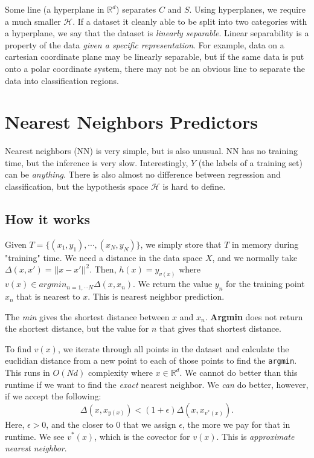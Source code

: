 \documentclass[titlepage, 12pt, leqno]{article}
\begin{document}
Some line (a hyperplane in $ \mathbb{R}^{d}$) separates $C$ and $S$. Using 
hyperplanes, we require a much smaller $ \mathcal{H}$. If a dataset it cleanly
able to be split into two categories with a hyperplane, we say that the dataset is
\textit{linearly separable}. Linear separability is a property of the data
\textit{given a specific representation}. For example, data on a cartesian 
coordinate plane may be linearly separable, but if the same data is put onto a
polar coordinate system, there may not be an obvious line to separate the data
into classification regions.

\pagebreak
\section{Nearest Neighbors Predictors}
Nearest neighbors (NN) is very simple, but is also unusual. NN has no training
time, but the inference is very slow. Interestingly, $Y$ (the labels of a
training set) can be \textit{anything}. There is also almost no difference 
between regression and classification, but the hypothesis space $ \mathcal{H}$ is
hard to define.

\subsection{How it works}
Given $T = \{(x_{1}, y_{1}), \cdots , (x_{N}, y_{N})\}$, we simply store that
$T$ in memory during "training" time. We need a distance in the data space $X$,
and we normally take $\Delta(x,x') = ||x-x'||^{2}$. Then, $h(x) = y_{v(x)}$ where
$v(x) \in argmin_{n=1, \cdots N}\Delta(x,x_{n})$. We return the value $y_{n}$ for
the training point $x_{n}$ that is nearest to $x$. This is nearest neighbor
prediction.

\begin{note}
    The \textit{min} gives the shortest distance between $x$ and $x_{n}$. 
    \textbf{Argmin} does not return the shortest distance, but the value for $n$
    that gives that shortest distance.
\end{note}

To find $v(x)$, we iterate through all points in the dataset and calculate the
euclidian distance from a new point to each of those points to find the 
\texttt{argmin}. This runs in $O(Nd)$ complexity where $x \in \mathbb{R}^{d}$. We
cannot do better than this runtime if we want to find the \textit{exact} nearest
neighbor. We \textit{can} do better, however, if we accept the following:
\[
    \Delta(x,x_{y(x)}) < (1+\epsilon)\Delta(x, x_{v^{*}(x)}).
\]
Here, $\epsilon >0$, and the closer to 0 that we assign $\epsilon$, the more we
pay for that in runtime. We see $v^{*}(x)$, which is the covector for $v(x)$.
This is \textit{approximate nearest neighbor}.
\end{document}
